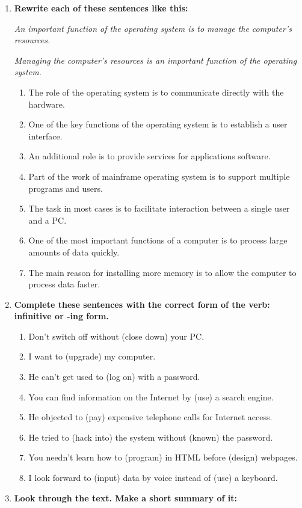 \documentclass{full}
\begin{document}
\nexttask
\begin{enumerate}[label=\textbf{\Roman*.},start=\gettask]
  \item \textbf{Rewrite each of these sentences like this:}

    \textit{An important function of the operating system is to manage the
    computer's resources.}

    \textit{Managing the computer's resources is an important function of the
    operating system.}

    \begin{enumerate}[label=\arabic*.]
      \item The role of the operating system is to communicate directly with the
        hardware.
      \item One of the key functions of the operating system is to establish a
        user interface.
      \item An additional role is to provide services for applications software.
      \item Part of the work of mainframe operating system is to support
        multiple programs and users.
      \item The task in most cases is to facilitate interaction between a single
        user and a PC.
      \item One of the most important functions of a computer is to process
        large amounts of data quickly.
      \item The main reason for installing more memory is to allow the computer
        to process data faster.
    \end{enumerate}

  \vspace{3ex}
  \nexttask
  \item \textbf{Complete these sentences with the correct form of the verb:
    infinitive or -ing form.}
    \begin{enumerate}[label=\arabic*.,itemsep=-0.5ex]
      \item Don't switch off without (close down) your PC.
      \item I want to (upgrade) my computer.
      \item He can't get used to (log on) with a password.
      \item You can find information on the Internet by (use) a search engine.
      \item He objected to (pay) expensive telephone calls for Internet access.
      \item He tried to (hack into) the system without (known) the password.
      \item You needn't learn how to (program) in HTML before (design) webpages.
      \item I look forward to (input) data by voice instead of (use) a keyboard.
    \end{enumerate}
    \vspace{1ex}

  \nexttask
  \item \textbf{Look through the text. Make a short summary of it:}
  \vspace{-2ex}
\end{enumerate}
\end{document}
